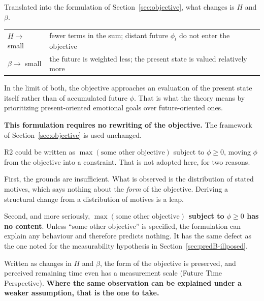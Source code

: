 Translated into the formulation of Section~\ref{sec:objective}, what changes is $H$ and
$\beta$.

\begin{center}
\begin{tabularx}{\textwidth}{@{}lX@{}}
\toprule
$H \to$ small & fewer terms in the sum; distant future $\phi_t$ do not enter the objective \\
$\beta \to$ small & the future is weighted less; the present state is valued relatively more \\
\bottomrule
\end{tabularx}
\label{tab:solo-h-beta}
\end{center}

In the limit of both, the objective approaches an evaluation of the present state itself
rather than of accumulated future $\phi$. That is what the theory means by prioritizing
present-oriented emotional goals over future-oriented ones.

\textbf{This formulation requires no rewriting of the objective.} The framework of
Section~\ref{sec:objective} is used unchanged.

\begin{remark}
\label{rem:phi-demotion-retracted}
R2 could be written as $\max(\text{some other objective})$ subject to $\phi\geq 0$, moving
$\phi$ from the objective into a constraint. That is not adopted here, for two reasons.

First, the grounds are insufficient. What is observed is the distribution of stated motives,
which says nothing about the \emph{form} of the objective. Deriving a structural change from
a distribution of motives is a leap.

Second, and more seriously, \textbf{$\max(\text{some other objective})$ subject to
$\phi\geq 0$ has no content}. Unless ``some other objective'' is specified, the formulation
can explain any behaviour and therefore predicts nothing. It has the same defect as the one
noted for the measurability hypothesis in Section~\ref{sec:predB-illposed}.

Written as changes in $H$ and $\beta$, the form of the objective is preserved, and perceived
remaining time even has a measurement scale (Future Time Perspective).
\textbf{Where the same observation can be explained under a weaker assumption, that is the
one to take.}
\end{remark}

